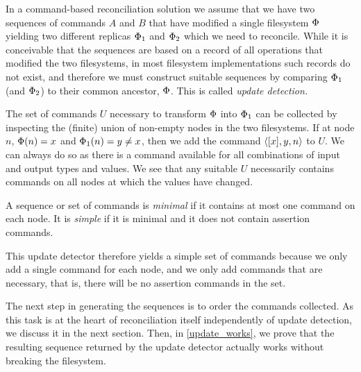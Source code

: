 
In a command-based reconciliation solution we assume that we have two sequences of commands
$A$ and $B$ that have modified a single filesystem $\Phi$ 
yielding two different replicas $\Phi_1$ and $\Phi_2$ which we
need to reconcile. While it is conceivable that the sequences are based on a record of
all operations that modified the two filesystems, in most filesystem implementations
such records do not exist, and therefore we must construct suitable sequences
by comparing $\Phi_1$ (and $\Phi_2$) to their common ancestor, $\Phi$. 
This is called \emph{update detection.}

The set of commands $U$ necessary to transform $\Phi$ into $\Phi_1$ can be collected
by inspecting the (finite) union of non-empty nodes in the two filesystems.
If at node $n$, $\Phi(n)=x$ and $\Phi_1(n)=y\neq x$, then we add the command $\langle{[x],y,n}\rangle$ to $U$.
We can always do so as there is a command available for all combinations of input and output types and values.
We see that any suitable $U$ necessarily contains commands on all nodes at which the values have changed.



\begin{mydef}
A sequence or set of commands is \emph{minimal} if it contains at most one command on each node.
It is \emph{simple} if it is minimal and it does not contain assertion commands.
\end{mydef}

This update detector therefore yields a simple set of commands because we only add a single command
for each node, and we only add commands that are necessary, that is, there will be no 
assertion commands in the set.

The next step in generating the sequences is to order the commands collected.
As this task is at the heart of reconciliation itself independently of update detection,
we discuss it in the next section.
Then, in \cref{update_works}, we prove that the resulting sequence 
returned by the update detector actually works without breaking the filesystem.
